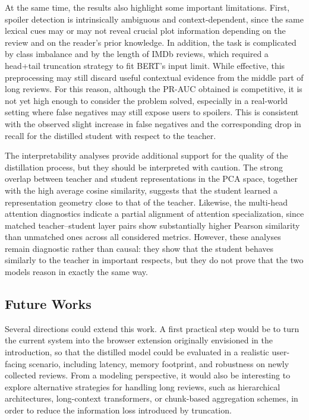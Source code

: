 \documentclass[11pt, a4paper]{article}
\begin{document}
At the same time, the results also highlight some important limitations. First, spoiler detection is intrinsically ambiguous and context-dependent, since the same lexical cues may or may not reveal crucial plot information depending on the review and on the reader’s prior knowledge. In addition, the task is complicated by class imbalance and by the length of IMDb reviews, which required a head+tail truncation strategy to fit BERT’s input limit. While effective, this preprocessing may still discard useful contextual evidence from the middle part of long reviews. For this reason, although the PR-AUC obtained is competitive, it is not yet high enough to consider the problem solved, especially in a real-world setting where false negatives may still expose users to spoilers. This is consistent with the observed slight increase in false negatives and the corresponding drop in recall for the distilled student with respect to the teacher. 

The interpretability analyses provide additional support for the quality of the distillation process, but they should be interpreted with caution. The strong overlap between teacher and student representations in the PCA space, together with the high average cosine similarity, suggests that the student learned a representation geometry close to that of the teacher. Likewise, the multi-head attention diagnostics indicate a partial alignment of attention specialization, since matched teacher--student layer pairs show substantially higher Pearson similarity than unmatched ones across all considered metrics. However, these analyses remain diagnostic rather than causal: they show that the student behaves similarly to the teacher in important respects, but they do not prove that the two models reason in exactly the same way. 

\subsection{Future Works}
Several directions could extend this work. A first practical step would be to turn the current system into the browser extension originally envisioned in the introduction, so that the distilled model could be evaluated in a realistic user-facing scenario, including latency, memory footprint, and robustness on newly collected reviews. From a modeling perspective, it would also be interesting to explore alternative strategies for handling long reviews, such as hierarchical architectures, long-context transformers, or chunk-based aggregation schemes, in order to reduce the information loss introduced by truncation. 
\end{document}
